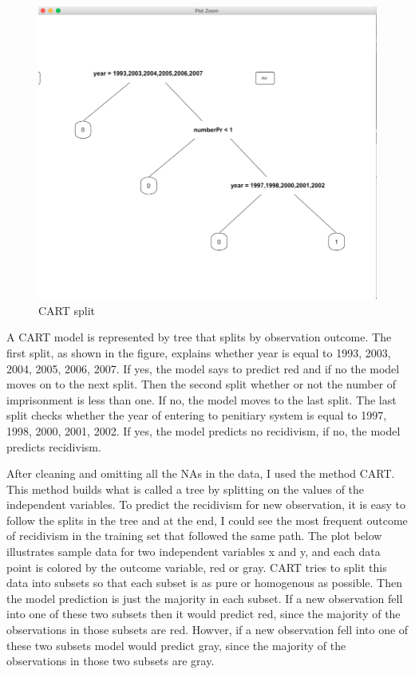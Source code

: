 \documentclass[a4paper,12pt]{article}
\begin{document}
\begin{figure}[h]
\centering
\includegraphics[scale=0.50]{Tree2.JPEG}
\caption{CART split}
\label{fig:Figure 1}
\end{figure}

A CART model is represented by tree that splits by observation outcome. The first split, as shown in the figure,  explains whether year is equal to 1993, 2003, 2004, 2005, 2006, 2007. If yes, the model says to predict red and if no the model moves on to the next split. Then the second split whether or not the number of imprisonment is less than one. If no, the model moves to the last split. The last split checks whether the year of entering to penitiary system is equal to 1997, 1998, 2000, 2001, 2002. If yes, the model predicts no recidivism, if no, the model predicts recidivism. 


After cleaning and omitting all the NAs in the data, I used the method CART. This method builds what is called a tree by splitting on the values of the independent variables. To predict the recidivism for new observation, it is easy to follow the splits in the tree and at the end, I could see the most frequent outcome of recidivism in the training set that followed the same path. 
The plot below illustrates sample data for two independent variables x and y, and each data point is colored by the outcome variable, red or gray. CART tries to split this data into subsets so that each subset is as pure or homogenous as possible. Then the model prediction is just the majority in each subset. If a new observation fell into one of these two subsets then it would predict red, since the majority of the observations in those subsets are red. Howver, if a new observation fell into one of these two subsets model would predict gray, since the majority of the observations in those two subsets are gray. 
\end{document}
